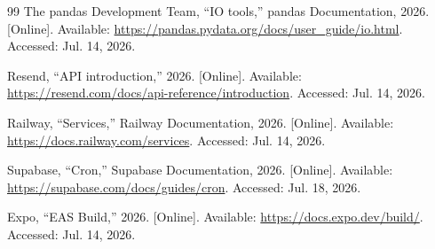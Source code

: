 \documentclass[12pt,a4paper,oneside]{report}
\begin{document}
\begin{thebibliography}{99}
The pandas Development Team, ``IO tools,'' pandas Documentation, 2026. [Online]. Available: \url{https://pandas.pydata.org/docs/user_guide/io.html}. Accessed: Jul. 14, 2026.

Resend, ``API introduction,'' 2026. [Online]. Available: \url{https://resend.com/docs/api-reference/introduction}. Accessed: Jul. 14, 2026.

Railway, ``Services,'' Railway Documentation, 2026. [Online]. Available: \url{https://docs.railway.com/services}. Accessed: Jul. 14, 2026.

Supabase, ``Cron,'' Supabase Documentation, 2026. [Online]. Available: \url{https://supabase.com/docs/guides/cron}. Accessed: Jul. 18, 2026.

Expo, ``EAS Build,'' 2026. [Online]. Available: \url{https://docs.expo.dev/build/}. Accessed: Jul. 14, 2026.

\end{thebibliography}
\end{document}
